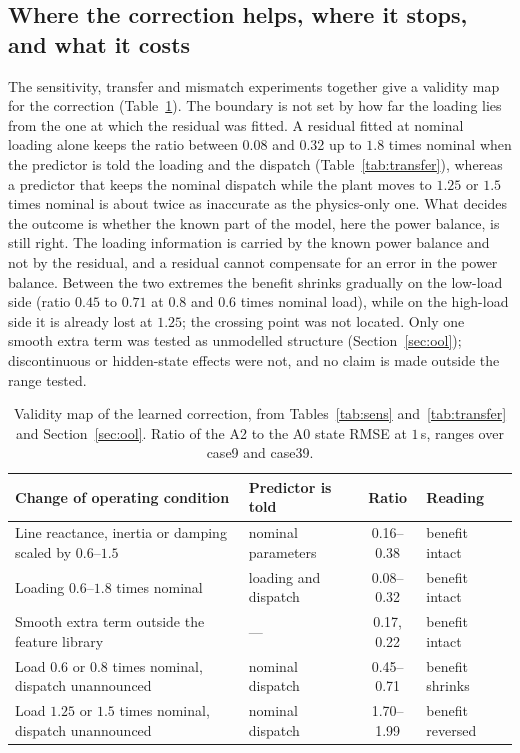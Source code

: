 \documentclass[preprint,12pt]{elsarticle}
\begin{document}
\subsection{Where the correction helps, where it stops, and what it costs}
\label{sec:regime}
The sensitivity, transfer and mismatch experiments together give a validity map for the correction (Table~\ref{tab:validity}). The boundary is not set by how far the loading lies from the one at which the residual was fitted. A residual fitted at nominal loading alone keeps the ratio between 0.08 and 0.32 up to $1.8$ times nominal when the predictor is told the loading and the dispatch (Table~\ref{tab:transfer}), whereas a predictor that keeps the nominal dispatch while the plant moves to $1.25$ or $1.5$ times nominal is about twice as inaccurate as the physics-only one. What decides the outcome is whether the known part of the model, here the power balance, is still right. The loading information is carried by the known power balance and not by the residual, and a residual cannot compensate for an error in the power balance. Between the two extremes the benefit shrinks gradually on the low-load side (ratio $0.45$ to $0.71$ at $0.8$ and $0.6$ times nominal load), while on the high-load side it is already lost at $1.25$; the crossing point was not located. Only one smooth extra term was tested as unmodelled structure (Section~\ref{sec:ool}); discontinuous or hidden-state effects were not, and no claim is made outside the range tested.

\begin{table}[!t]\centering\small
\caption{Validity map of the learned correction, from Tables~\ref{tab:sens} and~\ref{tab:transfer} and Section~\ref{sec:ool}. Ratio of the A2 to the A0 state RMSE at $1$\,s, ranges over case9 and case39.}
\label{tab:validity}
\begin{tabular}{>{\raggedright\arraybackslash}p{4.6cm}>{\raggedright\arraybackslash}p{2.8cm}cl}
\toprule
Change of operating condition & Predictor is told & Ratio & Reading\\
\midrule
Line reactance, inertia or damping scaled by $0.6$--$1.5$ & nominal parameters & 0.16--0.38 & benefit intact\\
Loading $0.6$--$1.8$ times nominal & loading and dispatch & 0.08--0.32 & benefit intact\\
Smooth extra term outside the feature library & --- & 0.17, 0.22 & benefit intact\\
Load $0.6$ or $0.8$ times nominal, dispatch unannounced & nominal dispatch & 0.45--0.71 & benefit shrinks\\
Load $1.25$ or $1.5$ times nominal, dispatch unannounced & nominal dispatch & 1.70--1.99 & benefit reversed\\
\bottomrule
\end{tabular}
\end{table}
\end{document}
